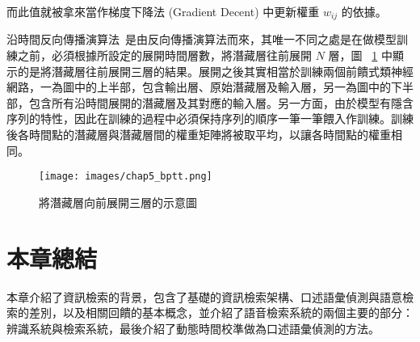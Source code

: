 而此值就被拿來當作梯度下降法 (Gradient Decent) 中更新權重 $w_{ij}$ 的依據。

沿時間反向傳播演算法~\cite{boden2002guide}是由反向傳播演算法而來，其唯一不同之處是在做模型訓練之前，必須根據所設定的展開時間層數，將潛藏層往前展開 $N$ 層，圖 ~\ref{fig:chap5_bptt}
中顯示的是將潛藏層往前展開三層的結果。展開之後其實相當於訓練兩個前饋式類神經網路，一為圖中的上半部，包含輸出層、原始潛藏層及輸入層，另一為圖中的下半部，包含所有沿時間展開的潛藏層及其對應的輸入層。另一方面，由於模型有隱含序列的特性，因此在訓練的過程中必須保持序列的順序一筆一筆餵入作訓練。訓練後各時間點的潛藏層與潛藏層間的權重矩陣將被取平均，以讓各時間點的權重相同。

\begin{figure}
\centering
\texttt{[image: images/chap5\_bptt.png]}
\caption{將潛藏層向前展開三層的示意圖} \label{fig:chap5_bptt}
\end{figure}

\section{本章總結}
本章介紹了資訊檢索的背景，包含了基礎的資訊檢索架構、口述語彙偵測與語意檢索的差別，以及相關回饋的基本概念，並介紹了語音檢索系統的兩個主要的部分：辨識系統與檢索系統，最後介紹了動態時間校準做為口述語彙偵測的方法。
